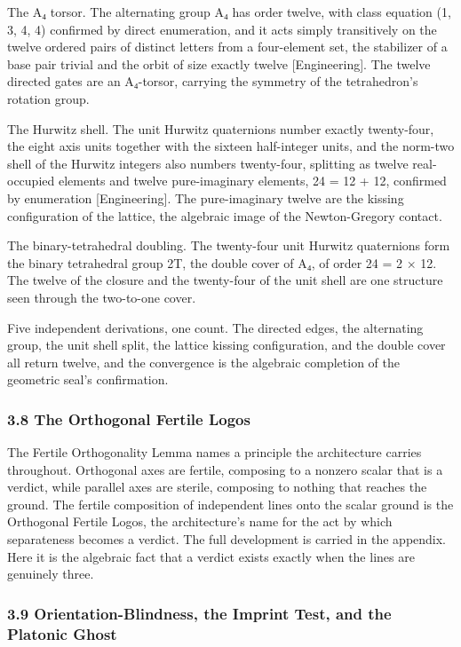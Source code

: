 \documentclass[10pt,twocolumn]{article}
\begin{document}
The A₄ torsor. The alternating group A₄ has order twelve, with class
equation (1, 3, 4, 4) confirmed by direct enumeration, and it acts
simply transitively on the twelve ordered pairs of distinct letters from
a four-element set, the stabilizer of a base pair trivial and the orbit
of size exactly twelve {[}Engineering{]}. The twelve directed gates are
an A₄-torsor, carrying the symmetry of the tetrahedron's rotation group.

The Hurwitz shell. The unit Hurwitz quaternions number exactly
twenty-four, the eight axis units together with the sixteen half-integer
units, and the norm-two shell of the Hurwitz integers also numbers
twenty-four, splitting as twelve real-occupied elements and twelve
pure-imaginary elements, 24 = 12 + 12, confirmed by enumeration
{[}Engineering{]}. The pure-imaginary twelve are the kissing
configuration of the lattice, the algebraic image of the Newton-Gregory
contact.

The binary-tetrahedral doubling. The twenty-four unit Hurwitz
quaternions form the binary tetrahedral group 2T, the double cover of
A₄, of order 24 = 2 × 12. The twelve of the closure and the twenty-four
of the unit shell are one structure seen through the two-to-one cover.

Five independent derivations, one count. The directed edges, the
alternating group, the unit shell split, the lattice kissing
configuration, and the double cover all return twelve, and the
convergence is the algebraic completion of the geometric seal's
confirmation.

\hypertarget{the-orthogonal-fertile-logos}{%
\subsubsection{3.8 The Orthogonal Fertile
Logos}\label{the-orthogonal-fertile-logos}}

The Fertile Orthogonality Lemma names a principle the architecture
carries throughout. Orthogonal axes are fertile, composing to a nonzero
scalar that is a verdict, while parallel axes are sterile, composing to
nothing that reaches the ground. The fertile composition of independent
lines onto the scalar ground is the Orthogonal Fertile Logos, the
architecture's name for the act by which separateness becomes a verdict.
The full development is carried in the appendix. Here it is the
algebraic fact that a verdict exists exactly when the lines are
genuinely three.

\hypertarget{orientation-blindness-the-imprint-test-and-the-platonic-ghost}{%
\subsubsection{3.9 Orientation-Blindness, the Imprint Test, and the
Platonic
Ghost}\label{orientation-blindness-the-imprint-test-and-the-platonic-ghost}}
\end{document}
